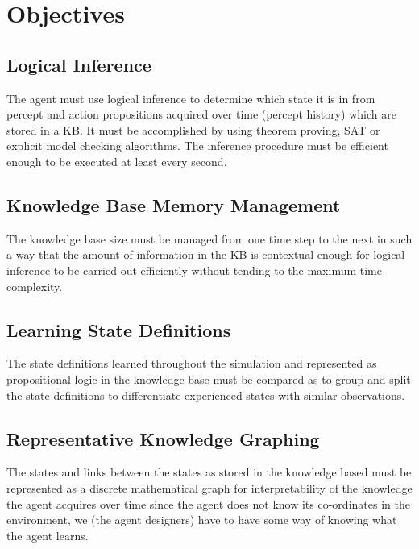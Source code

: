 \section{Objectives}
\subsection{Logical Inference}
The agent must use logical inference to determine which state it is in from percept and action propositions acquired over time (percept history) which are stored in a KB. It must be accomplished by using theorem proving, SAT or explicit model checking algorithms. The inference procedure must be efficient enough to be executed at least every second.
\subsection{Knowledge Base Memory Management}
The knowledge base size must be managed from one time step to the next in such a way that the amount of information in the KB is contextual enough for logical inference to be carried out efficiently without tending to the maximum time complexity.
\subsection{Learning State Definitions}
The state definitions learned throughout the simulation and represented as propositional logic in the knowledge base must be compared as to group and split the state definitions to differentiate experienced states with similar observations.
\subsection{Representative Knowledge Graphing}
The states and links between the states as stored in the knowledge based must be represented as a discrete mathematical graph for interpretability of the knowledge the agent acquires over time since the agent does not know its co-ordinates in the environment, we (the agent designers) have to have some way of knowing what the agent learns.


